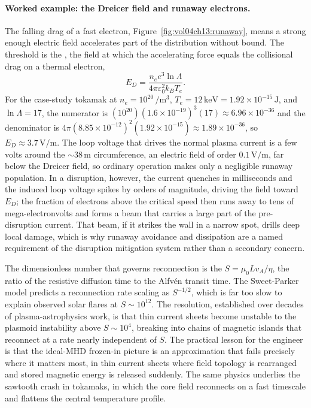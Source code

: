 \paragraph{Worked example: the Dreicer field and runaway electrons.}
The falling drag of a fast electron, Figure~\ref{fig:vol04ch13:runaway}, means a
strong enough electric field accelerates part of the distribution without bound.
The threshold is the , the field at which the accelerating
force equals the collisional drag on a thermal electron,
\[
E_D = \frac{n_e e^{3}\ln\Lambda}{4\pi\varepsilon_0^{2}k_B T_e}.
\]
For the case-study tokamak at $n_e = 10^{20}\,\si{\per\meter\cubed}$, $T_e =
12\,\si{\kilo\electronvolt} = 1.92\times 10^{-15}\,\si{\joule}$, and $\ln\Lambda
= 17$, the numerator is $(10^{20})(1.6\times 10^{-19})^{3}(17) \approx 6.96\times
10^{-36}$ and the denominator is $4\pi(8.85\times 10^{-12})^{2}(1.92\times
10^{-15}) \approx 1.89\times 10^{-36}$, so $E_D \approx 3.7\,\si{
\volt\per\meter}$. The loop voltage that drives the normal plasma current is a
few volts around the $\sim 38\,\si{\meter}$ circumference, an electric field of
order $0.1\,\si{\volt\per\meter}$, far below the Dreicer field, so ordinary
operation makes only a negligible runaway population. In a disruption, however,
the current quenches in milliseconds and the induced loop voltage spikes by
orders of magnitude, driving the field toward $E_D$; the fraction of electrons
above the critical speed then runs away to tens of mega-electronvolts and forms
a beam that carries a large part of the pre-disruption current. That beam, if it
strikes the wall in a narrow spot, drills deep local damage, which is why
runaway avoidance and dissipation are a named requirement of the disruption
mitigation system rather than a secondary concern.

\begin{mastery}
The dimensionless number that governs reconnection is the
 $S = \mu_{0}L v_{A}/\eta$, the ratio of the
resistive diffusion time to the Alfv\'en transit time. The Sweet-Parker
model predicts a reconnection rate scaling as $S^{-1/2}$, which is far too
slow to explain observed solar flares at $S \sim 10^{12}$. The resolution,
established over decades of plasma-astrophysics work, is that thin current
sheets become unstable to the plasmoid instability above $S \sim 10^{4}$,
breaking into chains of magnetic islands that reconnect at a rate nearly
independent of $S$. The practical lesson for the engineer is that the
ideal-MHD frozen-in picture is an approximation that fails precisely where
it matters most, in thin current sheets where field topology is rearranged
and stored magnetic energy is released suddenly. The same physics underlies
the sawtooth crash in tokamaks, in which the core field reconnects on a
fast timescale and flattens the central temperature profile.
\end{mastery}


